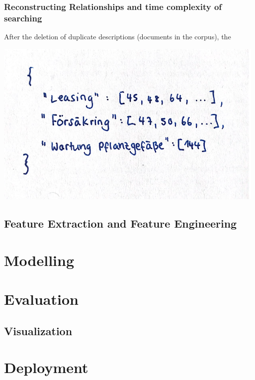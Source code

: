 		\subsubsection{Reconstructing Relationships and time complexity of searching}
		After the deletion of duplicate descriptions (documents in the corpus), the 
		
		\includegraphics[height=8cm]{Bilder/description_map.png}

	\subsection{Feature Extraction and Feature Engineering}

\section{Modelling}
\section{Evaluation}
	\subsection{Visualization}
\section{Deployment}